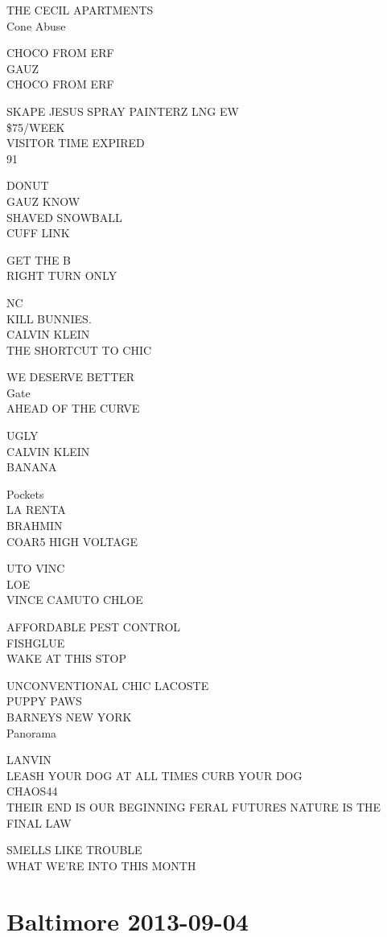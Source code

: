 \documentclass[10pt,letterpaper]{article}
\begin{document}
THE CECIL APARTMENTS\\
Cone Abuse

CHOCO FROM ERF\\
GAUZ\\
CHOCO FROM ERF

SKAPE JESUS SPRAY PAINTERZ LNG EW\\
\$75/WEEK\\
VISITOR TIME EXPIRED\\
91

DONUT\\
GAUZ KNOW\\
SHAVED SNOWBALL\\
CUFF LINK

GET THE B\\
RIGHT TURN ONLY

NC\\
KILL BUNNIES.\\
CALVIN KLEIN\\
THE SHORTCUT TO CHIC

WE DESERVE BETTER\\
Gate\\
AHEAD OF THE CURVE

UGLY\\
CALVIN KLEIN\\
BANANA

Pockets\\
LA RENTA\\
BRAHMIN\\
COAR5 HIGH VOLTAGE

UTO VINC\\
LOE\\
VINCE CAMUTO CHLOE

AFFORDABLE PEST CONTROL\\
FISHGLUE\\
WAKE AT THIS STOP

UNCONVENTIONAL CHIC LACOSTE\\
PUPPY PAWS\\
BARNEYS NEW YORK\\
Panorama

LANVIN\\
LEASH YOUR DOG AT ALL TIMES CURB YOUR DOG\\
CHAOS44\\
THEIR END IS OUR BEGINNING FERAL FUTURES NATURE IS THE FINAL LAW

SMELLS LIKE TROUBLE\\
WHAT WE'RE INTO THIS MONTH
\pagebreak

\section*{Baltimore 2013-09-04}
\end{document}
